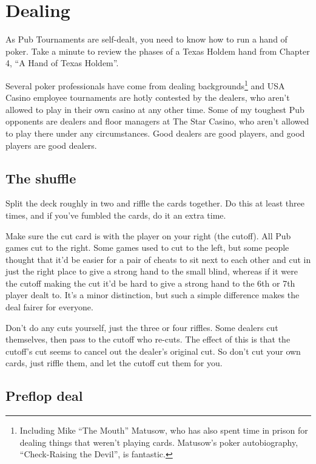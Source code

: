 \chapter{Dealing}


As Pub Tournaments are self-dealt, you need to know how
to run a hand of poker. Take a minute to review the phases of a Texas
Holdem hand from Chapter 4, ``A Hand of Texas Holdem''.

Several poker professionals have come from dealing
backgrounds\footnote{Including Mike ``The Mouth'' Matusow, who has also
spent time in prison for dealing things that weren't playing
cards. Matusow's poker autobiography, ``Check-Raising the Devil'', is
fantastic.} and USA Casino employee tournaments are hotly contested by
the dealers, who aren't allowed to play in their
own casino at any other time. Some of my toughest Pub opponents
are dealers and floor managers at The Star Casino, who aren't
allowed to play there under any circumstances. Good dealers are good
players, and good players are good dealers.

\section{The shuffle}

Split the deck roughly in two and riffle the cards together.
Do this at least three times, and if you've fumbled the cards,
do it an extra time.

Make sure the cut card is with the player on your right (the cutoff).
All Pub games cut to the right. Some games used to cut to
the left, but some people thought that it'd be
easier for a pair of cheats to sit next to each other and cut in just the
right place to give a strong hand to the small blind, whereas
if it were the cutoff making the cut it'd be hard to give a strong
hand to the 6th or 7th player dealt to. It's a minor distinction,
but such a simple difference makes the deal fairer for everyone.

Don't do any cuts yourself, just the three or four riffles. Some dealers
cut themselves, then pass to the cutoff who re-cuts. The effect of this
is that the cutoff's cut seems to cancel out the dealer's original cut.
So don't cut your own cards, just riffle them, and let the cutoff cut them
for you.

\section{Preflop deal}

